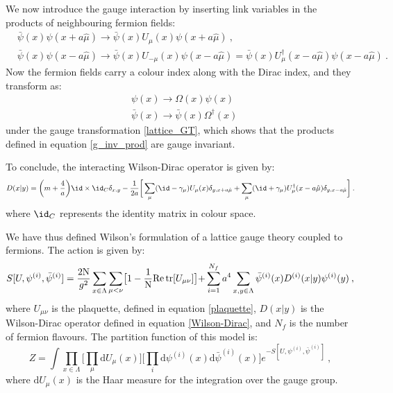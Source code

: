 We now introduce the gauge interaction by inserting link variables in the products of neighbouring fermion fields:
\begin{equation}
\begin{split}
& \bar \psi(x) \psi(x + a \hat\mu) \to \bar \psi(x) U_{\mu}(x) \psi(x + a \hat\mu) \: ,\\
& \bar \psi(x) \psi(x - a \hat\mu) \to \bar \psi(x) U_{-\mu}(x) \psi(x - a \hat\mu) = \bar \psi(x) U_{\mu}^{\dagger}(x - a\hat\mu) \psi(x - a \hat\mu) \: .
\end{split}
\label{g_inv_prod}
\end{equation}
%
Now the fermion fields carry a colour index  along with the Dirac index, and they transform as: 
\begin{equation}
\begin{split}
&\psi(x) \to \Omega(x) \psi(x) \\
&\bar\psi(x) \to \bar\psi(x) \Omega^{\dagger}(x)
\end{split}
\end{equation}
%
under the gauge transformation \ref{lattice_GT}, which shows that the products defined in equation \ref{g_inv_prod} are gauge invariant.

To conclude, the interacting Wilson-Dirac operator is given by:
\begin{equation}
D(x \vert y) = \biggl( m + \frac{4}{a}  \biggr)\id \times \id_C   \delta_{x,y} - \frac{1}{2a}  \biggr[ \sum_{\mu}(\id-\gamma_{\mu}) U_{\mu}(x) \delta_{y,x+a\hat\mu} + \sum_{\mu}(\id+\gamma_{\mu}) U_{\mu}^{\dagger}(x -a \hat\mu) \delta_{y,x-a\hat\mu} \biggl] \: .
\label{Wilson-Dirac}
\end{equation}
%
where $\id_C$ represents the identity matrix in colour space.

\bigskip

We have thus defined Wilson's formulation of a lattice gauge theory coupled to fermions. The action is given by:
\begin{equation}
S[U,\psi^{(i)}, \bar\psi^{(i)}] =  \frac{2 \mathrm N}{g^2} \sum_{x \in \Lambda}  \sum_{\mu < \nu} \bigr[  1 - \frac{1}{\mathrm{N}} \mathrm{Re} \tr  [U_{\mu \nu}] \bigl ] + \sum_{i=1}^{N_f} a^4 \sum_{x,y \in \Lambda} \bar\psi^{(i)}(x) D^{(i)}(x \vert y)\psi^{(i)}(y) \: ,
\label{lattice_action}
\end{equation}
%
where $U_{\mu\nu}$ is the plaquette, defined in equation \ref{plaquette}, $D(x \vert y)$ is the Wilson-Dirac operator defined in equation \ref{Wilson-Dirac}, and $N_f$ is the number of fermion flavours.
The partition function of this model is:
\begin{equation}
Z = \int  \prod_{x \in \Lambda} \biggr[ \prod_{\mu} \mathrm{d} U_{\mu}(x) \biggr] \biggl[ \prod_i \mathrm{d} \psi^{(i)}(x) \mathrm{d} \bar \psi^{(i)}(x) \biggr] e^{-S[U,\psi^{(i)}, \bar\psi^{(i)}]} \: ,
\label{partition_function}
\end{equation}
%
where $\mathrm{d} U_{\mu}(x)$ is the Haar measure for the integration over the gauge group.

